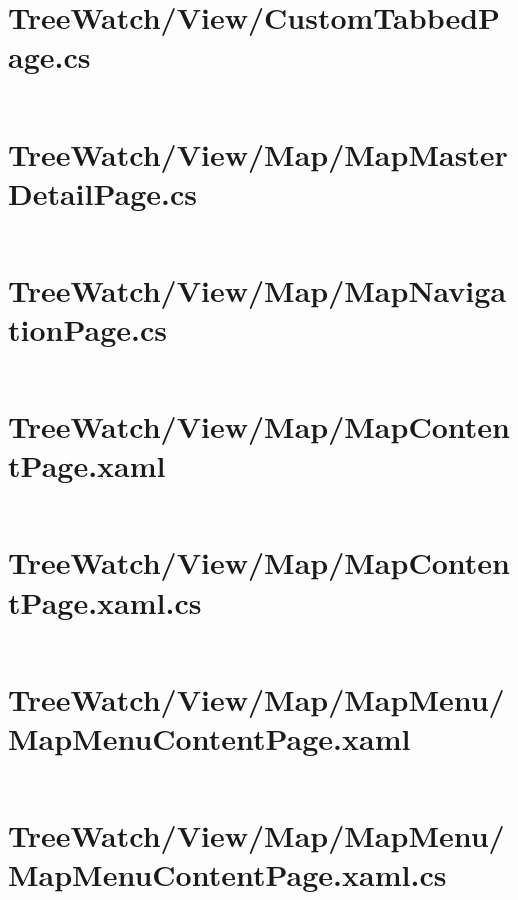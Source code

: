 \documentclass[12pt]{article}
\begin{document}
\tableofcontents
\clearpage




\section{TreeWatch/View/CustomTabbedPage.cs}
\inputminted[linenos,firstline=22]{csharp}{../../../src/TreeWatch/View/CustomTabbedPage.cs}

\pagebreak\section{TreeWatch/View/Map/MapMasterDetailPage.cs}
\inputminted[linenos,firstline=22]{csharp}{../../../src/TreeWatch/View/Map/MapMasterDetailPage.cs}

\pagebreak\section{TreeWatch/View/Map/MapNavigationPage.cs}
\inputminted[linenos,firstline=22]{csharp}{../../../src/TreeWatch/View/Map/MapNavigationPage.cs}

\pagebreak\section{TreeWatch/View/Map/MapContentPage.xaml}
\inputminted[linenos]{xml}{../../../src/TreeWatch/View/Map/MapContentPage.xaml}

\pagebreak\section{TreeWatch/View/Map/MapContentPage.xaml.cs}
\inputminted[linenos,firstline=22]{csharp}{../../../src/TreeWatch/View/Map/MapContentPage.xaml.cs}

\pagebreak\section{TreeWatch/View/Map/MapMenu/ MapMenuContentPage.xaml}
\inputminted[linenos]{xml}{../../../src/TreeWatch/View/Map/MapMenu/MapMenuContentPage.xaml}

\pagebreak\section{TreeWatch/View/Map/MapMenu/ MapMenuContentPage.xaml.cs}
\inputminted[linenos,firstline=22]{csharp}{../../../src/TreeWatch/View/Map/MapMenu/MapMenuContentPage.xaml.cs}
\end{document}
